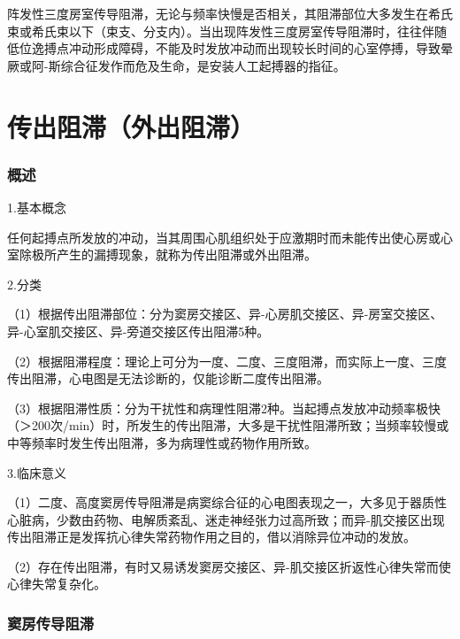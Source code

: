 阵发性三度房室传导阻滞，无论与频率快慢是否相关，其阻滞部位大多发生在希氏束或希氏束以下（束支、分支内）。当出现阵发性三度房室传导阻滞时，往往伴随低位逸搏点冲动形成障碍，不能及时发放冲动而出现较长时间的心室停搏，导致晕厥或阿-斯综合征发作而危及生命，是安装人工起搏器的指征。

\protect\hypertarget{text00030.html}{}{}

\protect\hypertarget{text00030.htmlux5cux23chapter30}{}{}

\chapter{传出阻滞（外出阻滞）}

\protect\hypertarget{text00030.htmlux5cux23subid359}{}{}

\subsection{概述}

1.基本概念

任何起搏点所发放的冲动，当其周围心肌组织处于应激期时而未能传出使心房或心室除极所产生的漏搏现象，就称为传出阻滞或外出阻滞。

2.分类

（1）根据传出阻滞部位：分为窦房交接区、异-心房肌交接区、异-房室交接区、异-心室肌交接区、异-旁道交接区传出阻滞5种。

（2）根据阻滞程度：理论上可分为一度、二度、三度阻滞，而实际上一度、三度传出阻滞，心电图是无法诊断的，仅能诊断二度传出阻滞。

（3）根据阻滞性质：分为干扰性和病理性阻滞2种。当起搏点发放冲动频率极快（＞200次/min）时，所发生的传出阻滞，大多是干扰性阻滞所致；当频率较慢或中等频率时发生传出阻滞，多为病理性或药物作用所致。

3.临床意义

（1）二度、高度窦房传导阻滞是病窦综合征的心电图表现之一，大多见于器质性心脏病，少数由药物、电解质紊乱、迷走神经张力过高所致；而异-肌交接区出现传出阻滞正是发挥抗心律失常药物作用之目的，借以消除异位冲动的发放。

（2）存在传出阻滞，有时又易诱发窦房交接区、异-肌交接区折返性心律失常而使心律失常复杂化。

\protect\hypertarget{text00030.htmlux5cux23subid360}{}{}

\subsection{窦房传导阻滞}

